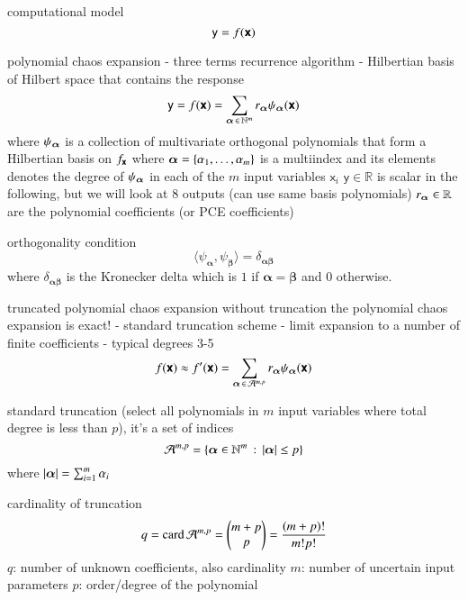 computational model
\begin{equation}
    \mathsf{y} = f(\boldsymbol{\mathsf{x}})
\end{equation}

polynomial chaos expansion
- three terms recurrence algorithm \cite{feinberg_chaospy_2015}
- Hilbertian basis of Hilbert space that contains the response \cite{sudret_global_2008}
\begin{equation}
    \mathsf{y} = f(\boldsymbol{\mathsf{x}}) = \sum_{{\bm{\alpha}} \,\in\, \mathbb{N}^m} r_{{\bm{\alpha}}} \psi_{{\bm{\alpha}}}(\boldsymbol{\mathsf{x}})
\end{equation}
where $\psi_{\bm{\alpha}}$ is a collection of multivariate orthogonal polynomials that form a Hilbertian basis on $f_{\boldsymbol{\mathsf{x}}}$
where ${\bm{\alpha}} = \{\alpha_1,\dots,\alpha_m\}$ is a multiindex and its elements
denotes the degree of $\psi_{\bm{\alpha}}$ in each of the $m$ input variables $\mathsf{x}_i$
$\mathsf{y}\in\mathbb{R}$ is scalar in the following, but we will look at 8 outputs (can use same basis polynomials)
$r_{\bm{\alpha}} \in \mathbb{R}$ are the polynomial coefficients (or PCE coefficients)

orthogonality condition
\begin{equation}
    \langle \psi_{\bm\alpha}, \psi_{\bm\beta} \rangle = \delta_{\bm{\alpha\beta}}
\end{equation}
where $\delta_{\bm{\alpha\beta}}$ is the Kronecker delta which is $1$ if $\bm\alpha=\bm\beta$ and $0$ otherwise.

truncated polynomial chaos expansion
without truncation the polynomial chaos expansion is exact! \cite{fajraoui_optimal_2017}
- standard truncation scheme \cite{gratiet_metamodel-based_2015,sudret_global_2008}
- limit expansion to a number of finite coefficients
- typical degrees 3-5 \cite{gratiet_metamodel-based_2015}
\begin{equation}
    f(\boldsymbol{\mathsf{x}}) \approx f'(\boldsymbol{\mathsf{x}}) = \sum_{{\bm{\alpha}} \,\in\, \mathcal{A}^{m,p}} r_{\bm{\alpha}} \psi_{\bm{\alpha}}(\boldsymbol{\mathsf{x}})
\end{equation}

standard truncation (select all polynomials in $m$ input variables where total degree is less than $p$), it's a set of indices
\begin{equation}
    \mathcal{A}^{m,p} = \left\{{\bm{\alpha}} \in \mathbb{N}^m \,:\, \left|{\bm{\alpha}}\right| \leq p\right\}
\end{equation}
where $\left|{\bm{\alpha}}\right| = \sum_{i=1}^m \alpha_i$

cardinality of truncation
\begin{equation}
    q = \text{card}\, \mathcal{A}^{m,p} = \left(\begin{matrix}
        m+p \\
        p
    \end{matrix}\right) = \frac{(m+p)!}{m!p!}
\end{equation}
$q$: number of unknown coefficients, also cardinality
$m$: number of uncertain input parameters
$p$: order/degree of the polynomial

